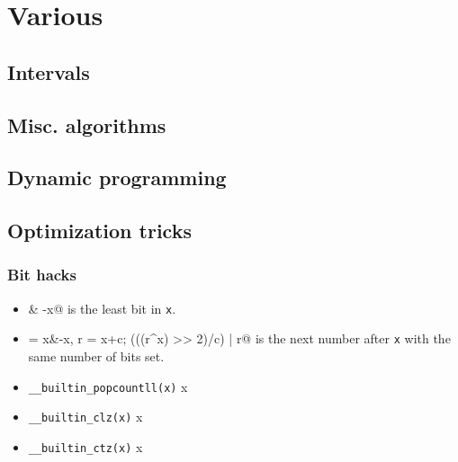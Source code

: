 \chapter{Various}

\section{Intervals}

\section{Misc. algorithms}

\section{Dynamic programming}

\section{Optimization tricks}
	\subsection{Bit hacks}
		\begin{itemize}
			\item \verb@x & -x@ is the least bit in \texttt{x}.
			\item \verb@c = x&-x, r = x+c; (((r^x) >> 2)/c) | r@ is the next number after \texttt{x} with the same number of bits set.
                        \item \texttt{\_\_builtin\_popcountll(x)} \quad {} x
                        \item \texttt{\_\_builtin\_clz(x)} \quad {} x
                        \item \texttt{\_\_builtin\_ctz(x)} \quad {} x
		\end{itemize}
